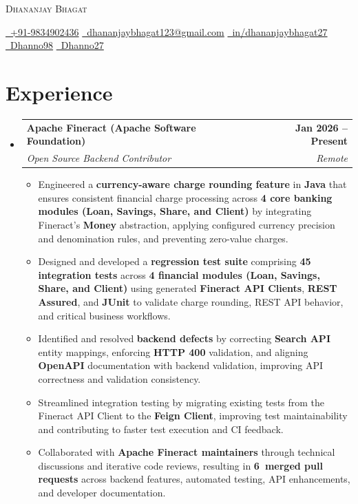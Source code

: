 \documentclass[letterpaper,11pt]{article}
\makeatletter
\newcommand{\resumeItem}[1]{\item\small{{#1 \vspace{-2pt}}}}
\newcommand{\resumeSubheading}[4]{
  \vspace{-2pt}\item
    \begin{tabular*}{1.0\textwidth}[t]{l@{\extracolsep{\fill}}r}
      \textbf{#1} & \textbf{\small #2} \\
      \textit{\small#3} & \textit{\small #4} \\
    \end{tabular*}\vspace{-6pt}
}
\newcommand{\resumeItemListStart}
{
\begin{itemize}[
leftmargin=0.2in,
label=\textbullet,
itemsep=2pt,
topsep=0pt
]
}
\newcommand{\resumeItemListEnd}{\end{itemize}\vspace{-2pt}}
\newcommand{\resumeSubHeadingListStart}{\begin{itemize}[leftmargin=0.0in, label={}]}
\newcommand{\resumeSubHeadingListEnd}{\end{itemize}}
\makeatother
\begin{document}
\begin{center}
    {\Huge \scshape Dhananjay Bhagat} \\ \vspace{4pt}

    \small
    \href{tel:+919834902436}{\faPhone\ +91-9834902436}
    \hspace{0.05cm}\textbar\hspace{0.05cm}
    \href{mailto:dhananjaybhagat123@gmail.com}{\faEnvelope\ dhananjaybhagat123@gmail.com}
    \hspace{0.05cm}\textbar\hspace{0.05cm}
    \href{https://www.linkedin.com/in/dhananjaybhagat27/}{\faLinkedin\ in/dhananjaybhagat27}
    \hspace{0.05cm}\textbar\hspace{0.05cm}
    \href{https://github.com/Dhanno98}{\faGithub\ Dhanno98}
    \hspace{0.05cm}\textbar\hspace{0.05cm}
    \href{https://leetcode.com/u/Dhanno27/}{\faCode\ Dhanno27}
\end{center}

\vspace{-8pt}

\section{Experience}
\resumeSubHeadingListStart
\resumeSubheading
{Apache Fineract (Apache Software Foundation)}{Jan 2026 -- Present}
{Open Source Backend Contributor}{Remote}
\resumeItemListStart
\resumeItem{
Engineered a \textbf{currency-aware charge rounding feature} in \textbf{Java} that ensures consistent financial charge processing across \textbf{4 core banking modules (Loan, Savings, Share, and Client)} by integrating Fineract's \textbf{Money} abstraction, applying configured currency precision and denomination rules, and preventing zero-value charges.
}
\resumeItem{
Designed and developed a \textbf{regression test suite} comprising \textbf{45 integration tests} across \textbf{4 financial modules (Loan, Savings, Share, and Client)} using generated \textbf{Fineract API Clients}, \textbf{REST Assured}, and \textbf{JUnit} to validate charge rounding, REST API behavior, and critical business workflows.
}
\resumeItem{
Identified and resolved \textbf{backend defects} by correcting \textbf{Search API} entity mappings, enforcing \textbf{HTTP 400} validation, and aligning \textbf{OpenAPI} documentation with backend validation, improving API correctness and validation consistency.
}
\resumeItem{
Streamlined integration testing by migrating existing tests from the Fineract API Client to the \textbf{Feign Client}, improving test maintainability and contributing to faster test execution and CI feedback.
}
\resumeItem{
Collaborated with \textbf{Apache Fineract maintainers} through technical discussions and iterative code reviews, resulting in \textbf{6~merged pull requests} across backend features, automated testing, API enhancements, and developer documentation.
}
\resumeItemListEnd
\resumeSubHeadingListEnd
\vspace{-4pt}
\end{document}
